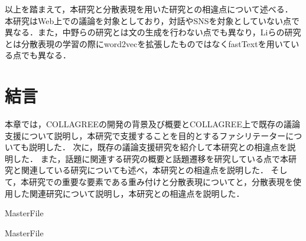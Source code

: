 以上を踏まえて，本研究と分散表現を用いた研究との相違点について述べる．
本研究はWeb上での議論を対象としており，対話やSNSを対象としていない点で異なる．また，中野らの研究とは文の生成を行わない点でも異なり，Liらの研究とは分散表現の学習の際にword2vecを拡張したものではなくfastTextを用いている点でも異なる．

\section{結言}
\label{rel:conclusion}
本章では，COLLAGREEの開発の背景及び概要とCOLLAGREE上で既存の議論支援について説明し，本研究で支援することを目的とするファシリテーターについても説明した．
次に，既存の議論支援研究を紹介して本研究との相違点を説明した．
また，話題に関連する研究の概要と話題遷移を研究している点で本研究と関連している研究についても述べ，本研究との相違点を説明した．
そして，本研究での重要な要素である重み付けと分散表現についてと，分散表現を使用した関連研究について説明し，本研究との相違点を説明した．

 \expandafter\ifx\csname MasterFile\endcsname\relax
	\def\BibFile{hoge}
	
  \fi
  \expandafter\ifx\csname MasterFile\endcsname\relax
  
  \fi
